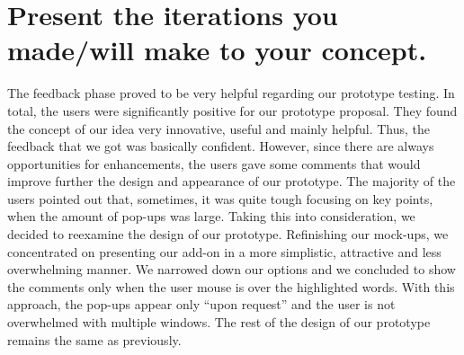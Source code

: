 \section{Present the iterations you made/will make to your concept.}
\label{s_8}

The feedback phase proved to be very helpful regarding our prototype testing. In 
total, the users were significantly positive for our prototype proposal. They 
found the concept of our  idea very innovative, useful and mainly helpful. Thus, 
the feedback that we got was basically confident. However, since there are 
always opportunities for enhancements, the users gave some comments that would 
improve further the design and appearance of our prototype. The majority of the 
users pointed out that, sometimes, it was quite tough focusing on key points, 
when the amount of pop-ups was large. Taking this into consideration, we decided 
to reexamine the design of our prototype. Refinishing our mock-ups, we 
concentrated on presenting our add-on in a more simplistic, attractive and less 
overwhelming manner. We narrowed down our options and we concluded to show the 
comments only when the user mouse is over the highlighted words. With this 
approach, the pop-ups appear only ``upon request'' and the user is not 
overwhelmed with multiple windows. The rest of the design of our prototype 
remains the same as previously. 
